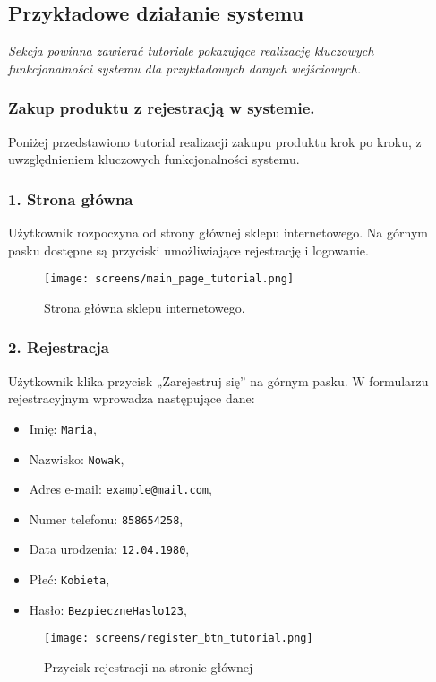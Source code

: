 \documentclass[12pt,a4paper,oneside]{article}
\theoremstyle{definition}
\numberwithin{equation}{section}
\begin{document}
\newpage
\subsection{Przykładowe działanie systemu}
\textit{Sekcja powinna zawierać tutoriale pokazujące realizację kluczowych funkcjonalności systemu dla przykładowych danych wejściowych.}



\subsubsection{Zakup produktu z rejestracją w systemie.}
Poniżej przedstawiono tutorial realizacji zakupu produktu krok po kroku, z uwzględnieniem kluczowych funkcjonalności systemu.

\subsubsection*{\textbf{1. Strona główna}}
Użytkownik rozpoczyna od strony głównej sklepu internetowego. Na górnym pasku dostępne są przyciski umożliwiające rejestrację i logowanie.

\begin{figure}[H]
    \centering
    \texttt{[image: screens/main\_page\_tutorial.png]}
    \caption{Strona główna sklepu internetowego.}
    \label{fig:main_page_tutorial}
\end{figure}

\subsubsection*{\textbf{2. Rejestracja}}
Użytkownik klika przycisk „Zarejestruj się” na górnym pasku. W formularzu rejestracyjnym wprowadza następujące dane:
\begin{itemize}
    \item Imię: \texttt{Maria},
    \item Nazwisko: \texttt{Nowak},
    \item Adres e-mail: \texttt{example@mail.com},
    \item Numer telefonu: \texttt{858654258},
    \item Data urodzenia: \texttt{12.04.1980},
    \item Płeć: \texttt{Kobieta},
    \item Hasło: \texttt{BezpieczneHaslo123},
\end{itemize}

\begin{figure}[H]
    \centering
    \texttt{[image: screens/register\_btn\_tutorial.png]}
    \caption{Przycisk rejestracji na stronie głównej}
    \label{fig:register_btn_tutorial}
\end{figure}
\end{document}
